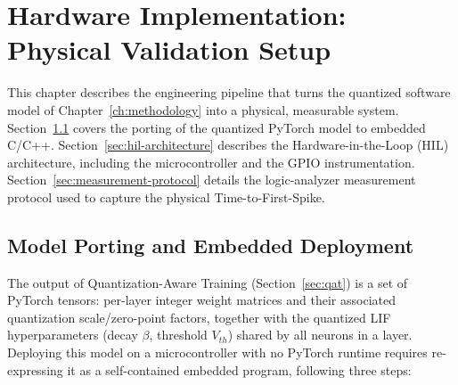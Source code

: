 \chapter{Hardware Implementation: Physical Validation Setup}
\label{ch:hardware}
\setlength{\parskip}{1em}

This chapter describes the engineering pipeline that turns the quantized software model of Chapter~\ref{ch:methodology} into a physical, measurable system. Section~\ref{sec:porting} covers the porting of the quantized PyTorch model to embedded C/C++. Section~\ref{sec:hil-architecture} describes the Hardware-in-the-Loop (HIL) architecture, including the microcontroller and the GPIO instrumentation. Section~\ref{sec:measurement-protocol} details the logic-analyzer measurement protocol used to capture the physical Time-to-First-Spike.

\section{Model Porting and Embedded Deployment}
\label{sec:porting}

The output of Quantization-Aware Training (Section~\ref{sec:qat}) is a set of PyTorch tensors: per-layer integer weight matrices and their associated quantization scale/zero-point factors, together with the quantized LIF hyperparameters (decay $\beta$, threshold $V_{th}$) shared by all neurons in a layer. Deploying this model on a microcontroller with no PyTorch runtime requires re-expressing it as a self-contained embedded program, following three steps:

